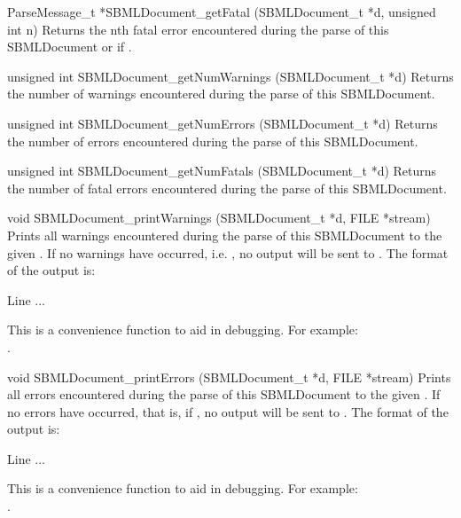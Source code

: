 \documentclass{sbmlmanual}
\begin{document}
\begin{methoddef}{ParseMessage\_t *SBMLDocument\_getFatal (SBMLDocument\_t *d,
unsigned int n)}
   Returns the nth fatal error encountered during the parse of this
   SBMLDocument or  if .
 \end{methoddef}


\begin{methoddef}{unsigned int SBMLDocument\_getNumWarnings
(SBMLDocument\_t *d)}
   Returns the number of warnings encountered during the parse of this
   SBMLDocument.
 \end{methoddef}

\begin{methoddef}{unsigned int SBMLDocument\_getNumErrors (SBMLDocument\_t *d)}
   Returns the number of errors encountered during the parse of this
   SBMLDocument.
 \end{methoddef}

\begin{methoddef}{unsigned int SBMLDocument\_getNumFatals (SBMLDocument\_t *d)}
   Returns the number of fatal errors encountered during the parse of this
   SBMLDocument.
 \end{methoddef}
  

\begin{methoddef}{void SBMLDocument\_printWarnings (SBMLDocument\_t *d,
FILE *stream)}
  Prints all warnings encountered during the parse of this SBMLDocument to
  the given .  If no warnings have occurred, i.e.
  , no output will be sent to
  . The format of the output is:
  \begin{example}
      Line %
      ...
  \end{example}
  This is a convenience function to aid in debugging.  For example:\\
  .
 \end{methoddef}
  

\begin{methoddef}{void SBMLDocument\_printErrors (SBMLDocument\_t *d,
FILE *stream)}
  Prints all errors encountered during the parse of this SBMLDocument
  to the given .  If no errors have occurred, that is, if 
  , no output will be sent
  to . The format of the output is:
  \begin{example}
      Line %
      ...
  \end{example}
  This is a convenience function to aid in debugging.  For example:\\
  .
 \end{methoddef}
  
\end{document}
